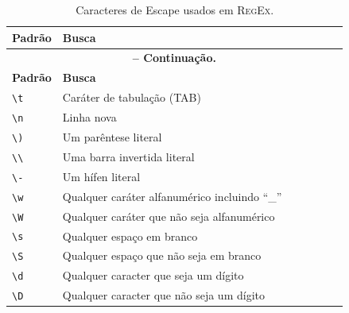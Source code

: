 \begin{refsection}
\begin{center}
\begin{longtable}{lllllll}
\end{longtable}
\end{center}



\pagestyle{fancy}
\begin{center}

\begin{longtable}{lllllll}
\caption[Tabela \ref{tut2:table:scape}:Caracteres de Escape usados em \textsc{RegEx}]{Caracteres de Escape usados em \textsc{RegEx}.} \label{tut2:table:scape} \\


\hline\hline \textbf{Padrão} & \textbf{Busca}\\
\endfirsthead

\multicolumn{6}{c}{{\bfseries \tablename\ \thetable{} -- Continuação.}}\\
\hline\hline \textbf{Padrão} & \textbf{Busca}\\
\endhead
\hline \hline
\endlastfoot
\texttt{\textbackslash t} & Caráter de tabulação (\textsc{TAB})\\
\texttt{\textbackslash n} & Linha nova\\
\texttt{\textbackslash )} & Um parêntese literal\\
\texttt{\textbackslash \textbackslash} & Uma barra invertida literal\\
\texttt{\textbackslash -} & Um hífen literal\\
\texttt{\textbackslash w} & Qualquer caráter alfanumérico incluindo ``\_''\\
\texttt{\textbackslash W} & Qualquer caráter que não seja alfanumérico\\
\texttt{\textbackslash s} & Qualquer espaço em branco\\
\texttt{\textbackslash S} & Qualquer espaço que não seja em branco\\
\texttt{\textbackslash d} & Qualquer caracter que seja um dígito\\
\texttt{\textbackslash D} & Qualquer caracter que não seja um dígito\\


\end{longtable}
\end{center}
\end{refsection}
